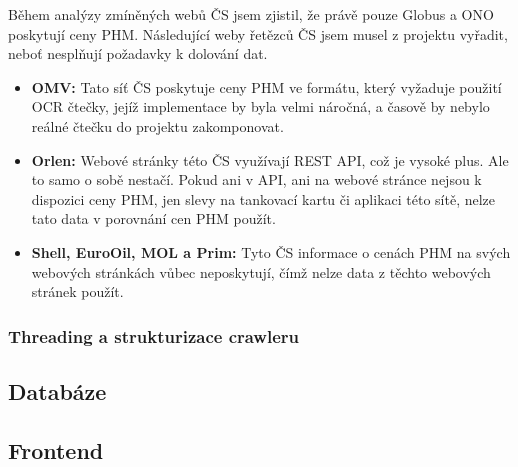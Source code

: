 Během analýzy zmíněných webů ČS jsem zjistil, že právě pouze Globus
a ONO poskytují ceny PHM. Následující weby řetězců ČS jsem musel
z projektu vyřadit, neboť nesplňují požadavky k dolování dat.

\begin{itemize}
    \item \textbf{OMV:} Tato síť ČS poskytuje ceny PHM ve formátu,
        který vyžaduje použití OCR čtečky, jejíž implementace
        by byla velmi náročná, a časově by nebylo reálné čtečku
        do projektu zakomponovat.
    \item \textbf{Orlen:} Webové stránky této ČS využívají REST API,
        což je vysoké plus. Ale to samo o sobě nestačí. Pokud ani
        v API, ani na webové stránce nejsou k dispozici ceny PHM,
        jen slevy na tankovací kartu či aplikaci této sítě, nelze
        tato data v porovnání cen PHM použít.
    \item \textbf{Shell, EuroOil, MOL a Prim:} Tyto ČS informace
        o cenách PHM na svých webových stránkách vůbec neposkytují,
        čímž nelze data z těchto webových stránek použít.
\end{itemize}

\subsubsection{Threading a strukturizace crawleru}


\subsection{Databáze}


\subsection{Frontend}


\endinput
